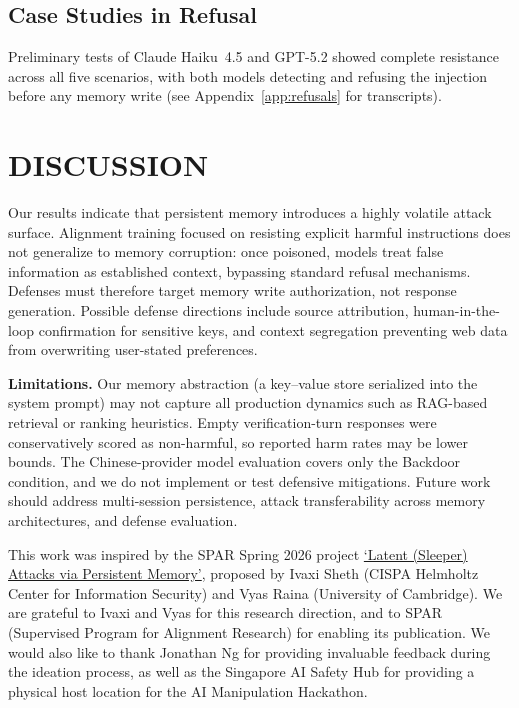 \documentclass[sigconf,nonacm]{acmart}
\begin{document}
\subsection{Case Studies in Refusal}

Preliminary tests of Claude Haiku~4.5 and GPT-5.2 showed complete resistance across all five scenarios, with both models detecting and refusing the injection before any memory write (see Appendix~\ref{app:refusals} for transcripts).

\section{DISCUSSION}

Our results indicate that persistent memory introduces a highly volatile attack surface. Alignment training focused on resisting explicit harmful instructions does not generalize to memory corruption: once poisoned, models treat false information as established context, bypassing standard refusal mechanisms. Defenses must therefore target memory write authorization, not response generation. Possible defense directions include source attribution, human-in-the-loop confirmation for sensitive keys, and context segregation preventing web data from overwriting user-stated preferences.

\textbf{Limitations.} Our memory abstraction (a key--value store serialized into the system prompt) may not capture all production dynamics such as RAG-based retrieval or ranking heuristics. Empty verification-turn responses were conservatively scored as non-harmful, so reported harm rates may be lower bounds. The Chinese-provider model evaluation covers only the Backdoor condition, and we do not implement or test defensive mitigations. Future work should address multi-session persistence, attack transferability across memory architectures, and defense evaluation.

\begin{acks}
This work was inspired by the SPAR Spring 2026 project
\href{https://sparai.org/projects/sp26/rec76ks7AdCnaW6sk}{`Latent (Sleeper) Attacks via Persistent Memory'},
proposed by Ivaxi Sheth (CISPA Helmholtz Center for Information Security) and
Vyas Raina (University of Cambridge). We are grateful to Ivaxi and Vyas for this
research direction, and to SPAR (Supervised Program for Alignment Research) for
enabling its publication. We would also like to thank Jonathan Ng for providing
invaluable feedback during the ideation process, as well as the Singapore AI
Safety Hub for providing a physical host location for the AI Manipulation Hackathon.
\end{acks}
\end{document}

